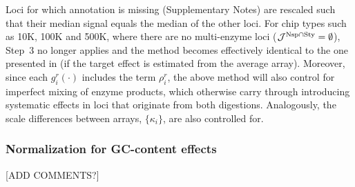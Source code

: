 \documentclass{bioinfo}
\newcommand{\Nsp}{\ensuremath{\textnormal{Nsp}}\xspace}
\newcommand{\Sty}{\ensuremath{\textnormal{Sty}}\xspace}
\begin{document}

Loci for which annotation is missing (Supplementary Notes) are rescaled such that their median signal equals the median of the other loci.
For chip types such as 10K, 100K and 500K, where there are no multi-enzyme loci ($\mathcal{J}^{\Nsp\cap\Sty} = \emptyset$), Step~3 no longer applies and the method becomes effectively identical to the one presented in \citet{BengtssonH_etal_2008} (if the target effect is estimated from the average array).
Moreover, since each $g^{r}_{i}(\cdot)$ includes the term $\rho^{r}_{i}$, the above method will also control for imperfect mixing of enzyme products, which otherwise carry through introducing systematic effects in loci that originate from both digestions.
Analogously, the scale differences between arrays, $\{\kappa_i\}$, are also controlled for.

\subsubsection{Normalization for GC-content effects}
\label{secGCnorm}

[ADD COMMENTS?]

\end{document}
